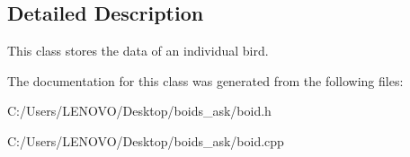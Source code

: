 \subsection{Detailed Description}
This class stores the data of an individual bird. 

The documentation for this class was generated from the following files\+:\begin{DoxyCompactItemize}
\item 
C\+:/\+Users/\+L\+E\+N\+O\+V\+O/\+Desktop/boids\+\_\+ask/boid.\+h\item 
C\+:/\+Users/\+L\+E\+N\+O\+V\+O/\+Desktop/boids\+\_\+ask/boid.\+cpp\end{DoxyCompactItemize}
